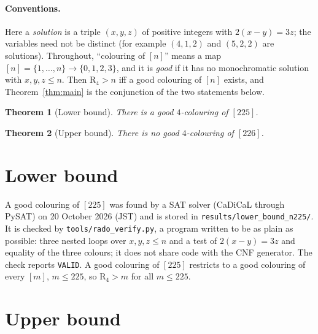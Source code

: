 \documentclass[11pt,a4paper]{article}
\newtheorem{theorem}{Theorem}
\theoremstyle{remark}
\newcommand{\R}{\mathrm{R}}
\begin{document}
\paragraph{Conventions.}
Here a \emph{solution} is a triple $(x,y,z)$ of positive integers with $2(x-y)=3z$; the variables need not be distinct
(for example $(4,1,2)$ and $(5,2,2)$ are solutions).
Throughout, ``colouring of $[n]$'' means a map $[n]=\{1,\dots,n\}\to\{0,1,2,3\}$, and it is \emph{good} if it has no monochromatic solution
with $x,y,z\le n$.
Then $\R_4>n$ iff a good colouring of $[n]$ exists, and Theorem~\ref{thm:main} is the conjunction of the two statements below.

\begin{theorem}[Lower bound]\label{thm:lower}
There is a good $4$-colouring of $[225]$.
\end{theorem}

\begin{theorem}[Upper bound]\label{thm:upper}
There is no good $4$-colouring of $[226]$.
\end{theorem}

\section{Lower bound}
A good colouring of $[225]$ was found by a SAT solver (CaDiCaL through PySAT) on 20 October 2026 (JST) and is stored in
\texttt{results/lower\_bound\_n225/}.
It is checked by \texttt{tools/rado\_verify.py}, a program written to be as plain as possible: three nested loops over
$x,y,z\le n$ and a test of $2(x-y)=3z$ and equality of the three colours; it does not share code with the CNF generator.
The check reports \texttt{VALID}.
A good colouring of $[225]$ restricts to a good colouring of every $[m]$, $m\le 225$, so $\R_4>m$ for all $m\le225$.

\section{Upper bound}
\end{document}

